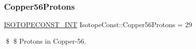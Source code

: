 \subsubsection{\texorpdfstring{Copper56\+Protons}{Copper56Protons}}
{\footnotesize\ttfamily \mbox{\hyperlink{group___isotope_const-_macros_ga5f18360b3e99483a35c32d789e62621c}{I\+S\+O\+T\+O\+P\+E\+C\+O\+N\+S\+T\+\_\+\+I\+NT}} Isotope\+Const\+::\+Copper56\+Protons = 29}

\$ \$ Protons in Copper-\/56. 